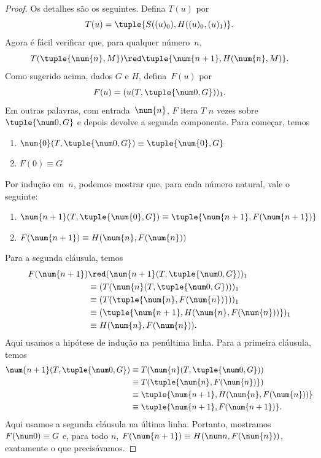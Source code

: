 \documentclass[../../../include/open-logic-section]{subfiles}
\begin{document}
\begin{proof}
Os detalhes são os seguintes. Defina $T(u)$ por
\[
T(u) = \tuple{S((u)_0), H((u)_0,(u)_1)}.
\]
Agora é fácil verificar que, para qualquer número~$n$,
\[
T(\tuple{\num{n}, M}) \red \tuple{\num{n+1}, H(\num{n}, M)}.
\]
Como sugerido acima, dados $G$ e $H$, defina~$F(u)$ por
\[
F(u) = (u(T,\tuple{\num 0, G}))_1.
\]
Em outras palavras, com entrada~$\num{n}$, $F$ itera $T$ $n$ vezes sobre
$\tuple{\num 0, G}$ e depois devolve a segunda componente. Para começar,
temos
\begin{enumerate}
\item $\num{0} (T, \tuple{\num 0, G}) \equiv \tuple{\num{0}, G}$
\item $F(\num{0}) \equiv G$
\end{enumerate}
Por indução em~$n$, podemos mostrar que, para cada número natural, vale o
seguinte:
\begin{enumerate}
\item $\num{n+1}(T, \tuple{\num{0}, G}) \equiv \tuple{\num{n+1}, F(\num{n+1})}$
\item $F(\num{n+1}) \equiv H(\num{n}, F(\num{n}))$
\end{enumerate}
Para a segunda cláusula, temos
\begin{align*}
F(\num{n+1}) & \red (\num{n+1}(T, \tuple{\num 0, G}))_1 \\
& \equiv (T(\num{n} (T, \tuple{\num 0, G})))_1 \\
& \equiv (T(\tuple{\num{n}, F(\num{n})}))_1 \\
& \equiv (\tuple{\num{n+1}, H(\num{n}, F(\num{n}))})_1 \\
& \equiv H(\num{n}, F(\num{n})).
\end{align*}
Aqui usamos a hipótese de indução na penúltima linha. Para a primeira
cláusula, temos
\begin{align*}
\num{n+1} (T, \tuple{\num 0, G}) &
\equiv T(\num{n} (T, \tuple{\num 0, G})) \\
& \equiv T( \tuple{\num{n}, F(\num{n})}) \\
& \equiv \tuple{\num{n+1}, H(\num{n}, F(\num{n}))} \\
& \equiv \tuple{\num{n+1}, F(\num{n+1})}.
\end{align*}
Aqui usamos a segunda cláusula na última linha. Portanto, mostramos
$F(\num 0) \equiv G$ e, para todo $n$, $F(\num {n+1}) \equiv H(\num
n, F(\num{n}))$, exatamente o que precisávamos.
\end{proof}
\end{document}
